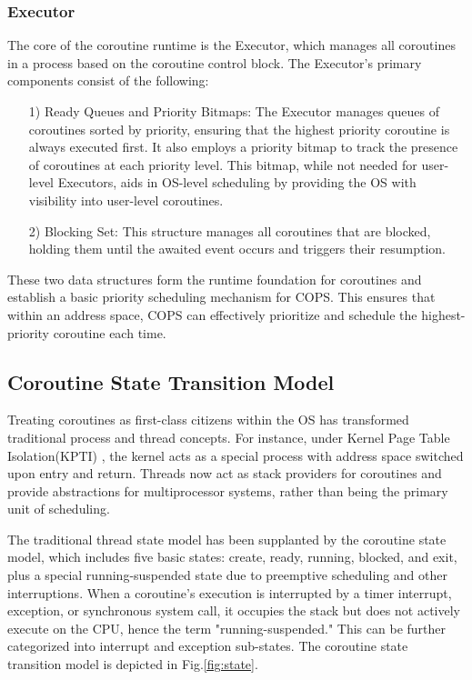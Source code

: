 \documentclass[conference]{IEEEtran}
\begin{document}
\subsubsection{Executor}
\label{subsubsection: executor}

The core of the coroutine runtime is the Executor, which manages all coroutines in a process based on the coroutine control block. The Executor's primary components consist of the following:

\begin{itemize}[leftmargin=*]
    \item[1)] Ready Queues and Priority Bitmaps: The Executor manages queues of coroutines sorted by priority, ensuring that the highest priority coroutine is always executed first. It also employs a priority bitmap to track the presence of coroutines at each priority level. This bitmap, while not needed for user-level Executors, aids in OS-level scheduling by providing the OS with visibility into user-level coroutines.
    \item[2)] Blocking Set: This structure manages all coroutines that are blocked, holding them until the awaited event occurs and triggers their resumption.
\end{itemize}

These two data structures form the runtime foundation for coroutines and establish a basic priority scheduling mechanism for COPS. This ensures that within an address space, COPS can effectively prioritize and schedule the highest-priority coroutine each time.

\subsection{Coroutine State Transition Model}
\label{section: state-transition}

Treating coroutines as first-class citizens within the OS has transformed traditional process and thread concepts. For instance, under Kernel Page Table Isolation(KPTI) \cite{kpti}, the kernel acts as a special process with address space switched upon entry and return. Threads now act as stack providers for coroutines and provide abstractions for multiprocessor systems, rather than being the primary unit of scheduling.

The traditional thread state model has been supplanted by the coroutine state model, which includes five basic states: create, ready, running, blocked, and exit, plus a special running-suspended state due to preemptive scheduling and other interruptions. When a coroutine's execution is interrupted by a timer interrupt, exception, or synchronous system call, it occupies the stack but does not actively execute on the CPU, hence the term "running-suspended." This can be further categorized into interrupt and exception sub-states. The coroutine state transition model is depicted in Fig.\ref{fig:state}.
\end{document}
